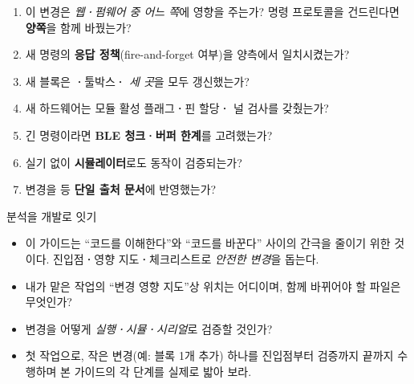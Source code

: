 \begin{enumerate}
  \item 이 변경은 \emph{웹\textbf{·}펌웨어 중 어느 쪽}에 영향을 주는가? 명령 프로토콜을
        건드린다면 \textbf{양쪽}을 함께 바꿨는가?
  \item 새 명령의 \textbf{응답 정책}(fire-and-forget 여부)을 양측에서 일치시켰는가?
  \item 새 블록은 \textbf{·}툴박스\textbf{·}
        \emph{세 곳}을 모두 갱신했는가?
  \item 새 하드웨어는 모듈 활성 플래그\textbf{·}핀 할당\textbf{·}
        널 검사를 갖췄는가?
  \item 긴 명령이라면 \textbf{BLE 청크\textbf{·}버퍼 한계}를 고려했는가?
  \item 실기 없이 \textbf{시뮬레이터}로도 동작이 검증되는가?
  \item 변경을  등 \textbf{단일 출처 문서}에 반영했는가?
\end{enumerate}

\begin{teachbox}{분석을 개발로 잇기}
\begin{itemize}
  \item 이 가이드는 ``코드를 이해한다''와 ``코드를 바꾼다'' 사이의 간극을 줄이기 위한 것이다.
        진입점\textbf{·}영향 지도\textbf{·}체크리스트로 \emph{안전한 변경}을 돕는다.
\end{itemize}
\begin{itemize}
  \item 내가 맡은 작업의 ``변경 영향 지도''상 위치는 어디이며, 함께 바뀌어야 할 파일은 무엇인가?
  \item 변경을 어떻게 \emph{실행\textbf{·}시뮬\textbf{·}시리얼}로 검증할 것인가?
\end{itemize}
\begin{itemize}
  \item 첫 작업으로, 작은 변경(예: 블록 1개 추가) 하나를 진입점부터 검증까지 끝까지
        수행하며 본 가이드의 각 단계를 실제로 밟아 보라.
\end{itemize}
\end{teachbox}
